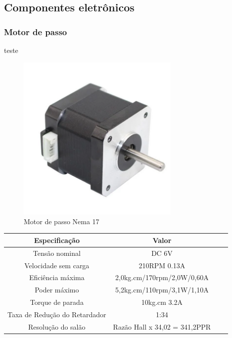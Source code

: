 \subsection{Componentes eletrônicos}

\subsubsection{Motor de passo}

teste
\begin{figure}[htb]
	\centering
	\includegraphics[width=0.7\textwidth]{figures/JK42HS40_1704_13A}
	\caption{Motor de passo Nema 17 \cite{motor_dc_6v_encoder}}
\end{figure}

\begin{quadro}[htb]
\caption{\label{Especificacoes_motordc_6v}Especificações do motor DC 6V}
	 \begin{tabular}{|c|c|c|c|}
		\hline
		\textbf{Especificação} & \textbf{Valor} \\ \hline
		Tensão nominal & DC 6V  \\ \hline
		Velocidade sem carga  & 210RPM 0.13A  \\ \hline
		Eficiência máxima & 2,0kg.cm/170rpm/2,0W/0,60A   \\ \hline
		Poder máximo & 5,2kg.cm/110rpm/3,1W/1,10A   \\ \hline
		Torque de parada  & 10kg.cm 3.2A    \\ \hline
		Taxa de Redução do Retardador & 1:34  \\ \hline
		Resolução do salão & Razão Hall x 34,02 = 341,2PPR  \\ \hline
	\end{tabular}
\end{quadro}


